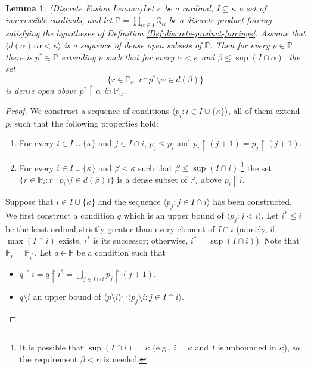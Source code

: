 \documentclass{article}
\theoremstyle{definition}
\theoremstyle{plain}
\newtheorem{lemma}[definition]{Lemma}
\newcommand{\po}{\mathbb{P}}
\newcommand{\qo}{\mathbb{Q}}
\newcommand{\la}{\langle}
\newcommand{\ra}{\rangle}
\newcommand{\uhr}{\upharpoonright}
\begin{document}
\begin{lemma}{\rm{(Discrete Fusion Lemma)}}\label{Lem:DiscreteFusion}
    Let $\kappa$ be a cardinal, $I\subseteq \kappa$ a set of inaccessible cardinals, and let $\po = \prod_{\alpha\in I}\qo_\alpha$ be a discrete product forcing satisfying the hypotheses of Definition \ref{Def:discrete-product-forcings}. Assume that $\la d(\alpha) \colon \alpha<\kappa \ra$ is a sequence of dense open subsets of $\po$. Then for every $p\in \po$ there is $p^*\in \po$ extending $p$ such that for every $\alpha<\kappa$ and $\beta\leq\sup(I\cap \alpha)$, the set 
    $$ \{ r\in \po_{\alpha} \colon r{}^\frown p^*\setminus \alpha\in d(\beta) \} $$
    is dense open above $p^*\uhr\alpha$ in $\po_{\alpha}$.
\end{lemma}

\begin{proof}
    We construct a sequence of conditions $\la p_i \colon i
    \in I\cup \{\kappa \}\ra$, all of them extend $p$, such that the following properties hold:
    \begin{enumerate}
        \item \label{Item:Fusioncoherence}For every $i\in I\cup\{\kappa\}$ and $j\in I\cap i$, $p_j \leq p_i$ and $p_i\uhr (j+1) = p_j\uhr (j+1)$.
        \item \label{Item:DenseSetCapturing}For every $i\in I\cup \{\kappa\}$ and $\beta<\kappa$ such that
        $\beta\leq\sup(I\cap i)$,\footnote{It is possible that $\sup(I\cap i) = \kappa$ (e.g., $i=\kappa$ and $I$ is unbounded in $\kappa$), so the requirement $\beta<\kappa$ is needed.}  the set $\{r\in \po_{i} \colon r{}^\frown p_i\setminus i\in d(\beta)
        )  \}$ is a dense subset of $\po_i$ above $p_i\uhr i$.
    \end{enumerate}

    Suppose that $i\in I\cup 
    \{\kappa\}$ and the sequence $\la p_j \colon j\in I\cap i \ra$ has been constructed. We first construct a condition $q$ which is an upper bound of $\langle p_j \colon j<i\rangle$. Let $i^*\leq i$ be the least ordinal strictly greater than every element of $I\cap i$ (namely, if $\max(I\cap i)$ exists, $i^*$ is its successor; otherwise, $i^* = \sup(I\cap i)$). Note that $\po_i =\po_{i^*}$. Let $q\in \po$ be a condition such that
    \begin{itemize}
        \item $q\uhr i = q\uhr i^* = \bigcup_{j\in I\cap i} p_j\uhr (j+1)$.
        \item $q\setminus i$ an upper bound of $\la p\setminus i \ra{}^\frown\la p_j\setminus i \colon j\in I\cap i \ra$.
    \end{itemize}


\end{proof}
\end{document}
